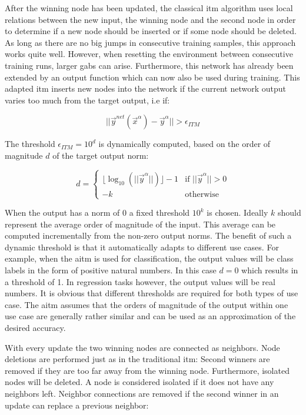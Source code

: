 After the winning node has been updated, the classical \gls{itm} algorithm uses local relations between the new input, the winning node and the second node in order to determine if a new node should be inserted or if some node should be deleted. As long as there are no big jumps in consecutive training samples, this approach works quite well. However, when resetting the environment between consecutive training runs, larger gabs can arise. Furthermore, this network has already been extended by an output function which can now also be used during training. This adapted \gls{itm} inserts new nodes into the network if the current network output varies too much from the target output, i.e if:

\begin{equation}
||\vec{y}^{net}(\vec{x}^\alpha)-\vec{y}^\alpha|| > \epsilon_{ITM}
\end{equation}

The threshold $\epsilon_{ITM} = 10^d$ is dynamically computed, based on the order of magnitude $d$ of the target output norm: %

\begin{equation}
d = \begin{cases}
\lfloor\log_{10}(||\vec{y}^\alpha||)\rfloor-1 & \text{if $||\vec{y}^\alpha|| > 0$} \\
-k & \text{otherwise}
\end{cases}
\end{equation}

When the output has a norm of $0$ a fixed threshold $10^k$ is chosen. Ideally $k$ should represent the average order of magnitude of the input. This average can be computed incrementally from the non-zero output norms. The benefit of such a dynamic threshold is that it automatically adapts to different use cases. For example, when the \gls{aitm} is used for classification, the output values will be class labels in the form of positive natural numbers. In this case $d=0$ which results in a threshold of 1. In regression tasks however, the output values will be real numbers. It is obvious that different thresholds are required for both types of use case. The \gls{aitm} assumes that the orders of magnitude of the output within one use case are generally rather similar and can be used as an approximation of the desired accuracy.

With every update the two winning nodes are connected as neighbors. Node deletions are performed just as in the traditional \gls{itm}: Second winners are removed if they are too far away from the winning node. Furthermore, isolated nodes will be deleted. A node is considered isolated if it does not have any neighbors left. Neighbor connections are removed if the second winner in an update can replace a previous neighbor:


